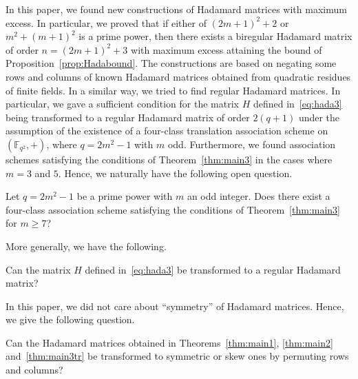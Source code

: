\documentclass[ALCO,ThmDefs,Unicode]{cedram}
\newcommand*\F{{\mathbb F}}
\begin{document}
In this paper, we found new constructions of Hadamard matrices with maximum excess. In particular, we proved that if either of $(2m+1)^2+2$ or $m^2+(m+1)^2$ is a prime power, then there exists a biregular Hadamard matrix of order $n=(2m+1)^2+3$ with maximum excess attaining the bound of Proposition~\ref{prop:Hadabound}. The constructions are based on negating some rows and columns of known Hadamard matrices obtained from quadratic residues of finite fields. In a similar way, we tried to find regular Hadamard matrices. In particular, we gave a sufficient condition for the matrix $H$ defined in~\eqref{eq:hada3} being transformed to a regular Hadamard matrix of order $2(q+1)$ under the assumption of the existence of a four-class translation association scheme on $(\F_{q^2},+)$, where $q=2m^2-1$ with $m$ odd. Furthermore, we found association schemes satisfying the conditions of Theorem~\ref{thm:main3} in the cases where $m=3$ and $5$. Hence, we naturally have the following open question.

\begin{ques}
Let $q=2m^2-1$ be a prime power with $m$ an odd integer. Does there exist a four-class association scheme satisfying the conditions of Theorem~\ref{thm:main3} for $m\ge 7$?
\end{ques}

More generally, we have the following.

\begin{ques}
Can the matrix $H$ defined in~\eqref{eq:hada3} be transformed to a regular Hadamard matrix?
\end{ques}

In this paper, we did not care about ``symmetry'' of Hadamard matrices. Hence, we give the following question.

\begin{ques}
Can the Hadamard matrices obtained in Theorems~\ref{thm:main1}, \ref{thm:main2} and~\ref{thm:main3tr} be transformed to symmetric or skew ones by permuting rows and columns?
\end{ques}


\nocite{*}



\end{document}
